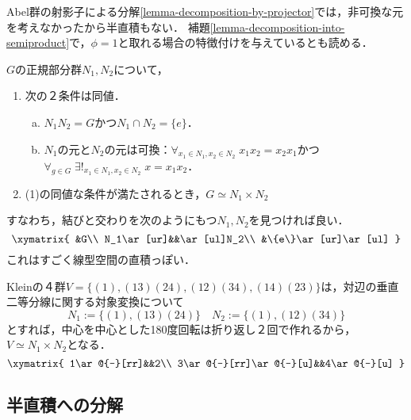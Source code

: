 \documentclass[uplatex,dvipdfmx]{jsreport}
\begin{document}
\begin{tcolorbox}[colframe=ForestGreen, colback=ForestGreen!10!white,breakable,colbacktitle=ForestGreen!40!white,coltitle=black,fonttitle=\bfseries\sffamily,
title=]
    Abel群の射影子による分解\ref{lemma-decomposition-by-projector}では，非可換な元を考えなかったから半直積もない．
    補題\ref{lemma-decomposition-into-semiproduct}で，$\phi=1$と取れる場合の特徴付けを与えているとも読める．
\end{tcolorbox}

\begin{theorem}
    $G$の正規部分群$N_1,N_2$について，
    \begin{enumerate}
        \item 次の２条件は同値．
        \begin{enumerate}[(a)]
            \item $N_1N_2=G$かつ$N_1\cap N_2=\{e\}$．
            \item $N_1$の元と$N_2$の元は可換：$\forall_{x_1\in N_1,x_2\in N_2}\;x_1x_2=x_2x_1$かつ$\forall_{g\in G}\;\exists!_{x_1\in N_1,x_2\in N_2}\;x=x_1x_2$．
        \end{enumerate}
        \item (1)の同値な条件が満たされるとき，$G\simeq N_1\times N_2$
    \end{enumerate}
\end{theorem}
\begin{remarks}
    すなわち，結びと交わりを次のようにもつ$N_1,N_2$を見つければ良い．
    \[\xymatrix{
        &G\\
        N_1\ar[ur]&&\ar[ul]N_2\\
        &\{e\}\ar[ur]\ar[ul]
    }\]
    これはすごく線型空間の直積っぽい．
\end{remarks}

\begin{example}\label{exp-decomposition-of-Klein-four-group}
    Kleinの４群$V=\{(1),(13)(24),(12)(34),(14)(23)\}$は，対辺の垂直二等分線に関する対象変換について
    \[N_1:=\{(1),(13)(24)\}\quad N_2:=\{(1),(12)(34)\}\]
    とすれば，中心を中心とした180度回転は折り返し２回で作れるから，
    $V\simeq N_1\times N_2$となる．
    \[\xymatrix{
        1\ar@{-}[rr]&&2\\
        3\ar@{-}[rr]\ar@{-}[u]&&4\ar@{-}[u]
    }\]
\end{example}


\subsection{半直積への分解}
\end{document}
